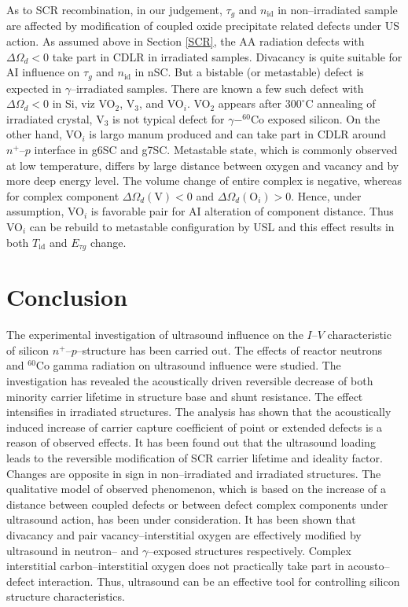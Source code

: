 \documentclass[aip,jap, amsmath,amssymb,reprint]{revtex4-1}
\begin{document}
As to SCR recombination, in our judgement, $\tau_g$ and $n_\mathrm{id}$ in non--irradiated sample
are affected by modification of coupled oxide precipitate related defects under US action.
As assumed above  in Section \ref{SCR},
the AA radiation defects with $\Delta\Omega_d<0$ take part in CDLR in irradiated samples.
Divacancy is quite suitable for AI influence on $\tau_g$ and $n_\mathrm{id}$ in nSC.
But a bistable (or metastable) defect is expected in $\gamma$--irradiated samples.
There are known a few such defect with $\Delta\Omega_d<0$ in Si,
viz VO$_2$,\cite{V2Obistable}
V$_3$,\cite{V3:Markevich}
and VO$_i$.\cite{Bistable:UFN}
VO$_2$ appears after $300^\circ$C annealing of irradiated crystal,
V$_3$ is not typical defect for $\gamma-^{60}$Co exposed silicon.
On the other hand, VO$_i$ is largo manum produced and can take part in CDLR around $n^+$--$p$
interface in g6SC and g7SC.
Metastable state, which is commonly observed at low temperature, differs by large distance between oxygen and vacancy and
by  more deep energy level.\cite{Bistable:UFN}
The volume change of entire complex is negative,
whereas for complex component $\Delta\Omega_d(\mbox{V})<0$ and
$\Delta\Omega_d(\mbox{O}_i)>0$.
Hence, under assumption, VO$_i$ is favorable pair for AI alteration of component distance.
Thus VO$_i$ can be rebuild to metastable configuration by USL and
this effect results in  both $T_{\mathrm{id}}$ and $E_{\tau g}$ change.



\section{Conclusion}
The experimental investigation of ultrasound influence on the $I$--$V$ characteristic of silicon $n^+$--$p$--structure has been carried out.
The effects of reactor neutrons and $^{60}$Co gamma radiation on ultrasound influence were studied.
The investigation has revealed the acoustically driven reversible decrease of both minority carrier lifetime in structure base and shunt resistance.
The effect intensifies in irradiated structures.
The analysis has shown that the acoustically induced increase of carrier capture coefficient of point or extended defects is a reason of observed effects.
It has been found out that the ultrasound loading leads to the reversible modification of SCR carrier lifetime and ideality factor.
Changes are opposite in sign in non--irradiated and irradiated structures.
The qualitative model of observed phenomenon, which is based on the increase of a distance between coupled defects or between defect complex components under ultrasound action, has been under consideration.
It has been shown that divacancy and pair vacancy--interstitial oxygen are effectively modified by ultrasound in neutron-- and $\gamma$--exposed structures respectively.
Complex interstitial carbon--interstitial oxygen does not practically take part in acousto--defect interaction.
Thus, ultrasound can be an effective tool for controlling silicon structure characteristics.


\end{document}
